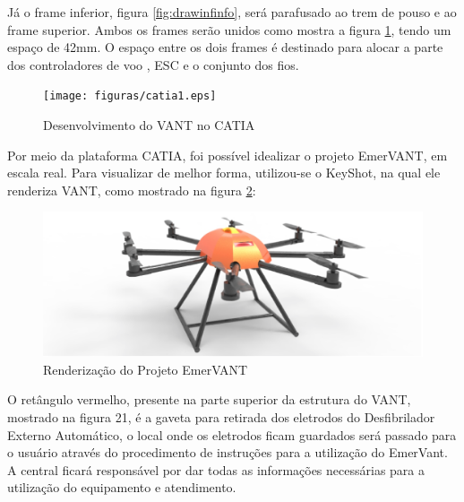 Já o frame inferior, figura \ref{fig:drawinfinfo}, será parafusado ao trem de pouso e ao frame superior.  Ambos os frames serão unidos como mostra a figura \ref{fig:catia1}, tendo um espaço de 42mm. O espaço entre os dois frames é destinado para alocar a parte dos controladores de voo , ESC e o conjunto dos fios.

\begin{figure}[H]
    \centering
      \texttt{[image: figuras/catia1.eps]}
    \caption{Desenvolvimento do VANT no CATIA}
    \label{fig:catia1}
\end{figure}

Por meio da plataforma CATIA, foi possível idealizar o projeto EmerVANT, em escala real. Para visualizar de melhor forma, utilizou-se o KeyShot, na qual ele renderiza VANT, como mostrado na figura \ref{fig:keyshot1}:

\begin{figure}[H]
    \centering
      \includegraphics[keepaspectratio=true,scale=0.5]{figuras/keyshot1.eps}
    \caption{ Renderização do Projeto EmerVANT}
    \label{fig:keyshot1}
\end{figure}

O retângulo vermelho, presente na parte superior da estrutura do VANT, mostrado na figura 21, é a gaveta para retirada dos eletrodos do Desfibrilador Externo Automático, o local onde os eletrodos ficam guardados será passado para o usuário através do procedimento de instruções para a utilização do EmerVant. A central ficará responsável por dar todas as informações necessárias para a utilização do equipamento e atendimento.

